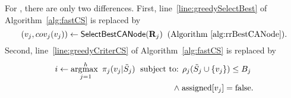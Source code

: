 
For \fastca, there are only two differences. First, line~\ref{line:greedySelectBest} of Algorithm~\ref{alg:fastCS} is replaced by $$(v_j, cov_j(v_j)) \gets \mathsf{SelectBestCANode}(\mathbf{R}_j) \;\; \mbox{(Algorithm~\ref{alg:rrBestCANode})}.$$ Second, line~\ref{line:greedyCriterCS} of Algorithm~\ref{alg:fastCS} is replaced by \begin{align*}i \leftarrow \operatorname*{\arg\!\max~}_{j=1}^h \pi_j(v_j | \tilde{S}_j) \; \mbox{ subject to: } \rho_j(\tilde{S}_j \cup \{v_j\}) \le B_j \; \\ \wedge \; \text{assigned}[v_j] = \text{false}.\end{align*}



